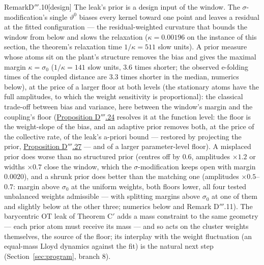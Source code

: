 \begin{rmk}{Remark}{D$'''$.10}[design]
The leak's prior is a design input of the window. The $\sigma$-modification's single $\vartheta^0$ biases every
kernel toward one point and leaves a residual at the fitted configuration --- the residual-weighted curvature that
bounds the window from below and slows the relaxation ($\kappa = 0.00196$ on the instance of this section, the
theorem's relaxation time $1/\kappa = 511$ slow units). A prior measure whose atoms sit on the plant's structure
removes the bias and gives the maximal margin $\kappa = \sigma_0$ ($1/\kappa = 141$ slow units, 3.6 times shorter;
the observed e-folding times of the coupled distance are 3.3 times shorter in the median, numerics below), at the
price of a larger floor at both levels (the stationary atoms have the full amplitudes, to which the weight
sensitivity is proportional): the classical trade-off between bias and variance, here between the window's margin
and the coupling's floor (\hyperref[res:thmDppp:24]{Proposition D$'''$.24} resolves it at the function level: the
floor is the weight-slope of the bias, and an adaptive prior removes both, at the price of the collective rate, of
the leak's a-priori bound --- restored by projecting the prior, \hyperref[res:thmDppp:27]{Proposition D$'''$.27}
--- and of a larger parameter-level floor). A misplaced prior does worse than no structured prior (centres off by
$0.6$, amplitudes
$\times1.2$ or widths $\times0.7$ close the window, which the $\sigma$-modification keeps open with margin
$0.0020$), and a shrunk prior does better than the matching one (amplitudes $\times0.5$--$0.7$: margin above
$\sigma_0$ at the uniform weights, both floors lower, all four tested unbalanced weights admissible --- with
splitting margins above $\sigma_0$ at one of them and slightly below at the other three; numerics below and
Remark D$'''$.11). The barycentric OT leak of Theorem C$'$ adds a mass constraint to the same geometry --- each
prior atom must receive its mass --- and so acts on the cluster weights themselves, the source of the floor; its
interplay with the weight fluctuation (an equal-mass Lloyd dynamics against the fit) is the natural next step
(Section~\ref{sec:program}, branch 8).
\end{rmk}

